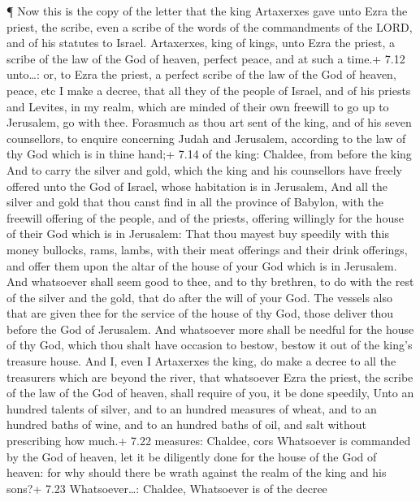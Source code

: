  ¶ Now this is the copy of the letter that the king
Artaxerxes gave unto Ezra the priest, the scribe, even a scribe of the
words of the commandments of the LORD, and of his statutes to Israel.
 Artaxerxes, king of kings, unto Ezra the priest, a scribe
of the law of the God of heaven, perfect peace, and at such a time.+
7.12 unto\ldots: or, to Ezra the priest, a perfect scribe of the law of
the God of heaven, peace, etc  I make a decree, that all
they of the people of Israel, and of his priests and Levites, in my
realm, which are minded of their own freewill to go up to Jerusalem, go
with thee.  Forasmuch as thou art sent of the king, and of
his seven counsellors, to enquire concerning Judah and Jerusalem,
according to the law of thy God which is in thine hand;+ 7.14 of the
king: Chaldee, from before the king  And to carry the
silver and gold, which the king and his counsellors have freely offered
unto the God of Israel, whose habitation is in Jerusalem, 
And all the silver and gold that thou canst find in all the province of
Babylon, with the freewill offering of the people, and of the priests,
offering willingly for the house of their God which is in Jerusalem:
 That thou mayest buy speedily with this money bullocks,
rams, lambs, with their meat offerings and their drink offerings, and
offer them upon the altar of the house of your God which is in
Jerusalem.  And whatsoever shall seem good to thee, and to
thy brethren, to do with the rest of the silver and the gold, that do
after the will of your God.  The vessels also that are
given thee for the service of the house of thy God, those deliver thou
before the God of Jerusalem.  And whatsoever more shall be
needful for the house of thy God, which thou shalt have occasion to
bestow, bestow it out of the king's treasure house.  And I,
even I Artaxerxes the king, do make a decree to all the treasurers which
are beyond the river, that whatsoever Ezra the priest, the scribe of the
law of the God of heaven, shall require of you, it be done speedily,
 Unto an hundred talents of silver, and to an hundred
measures of wheat, and to an hundred baths of wine, and to an hundred
baths of oil, and salt without prescribing how much.+ 7.22 measures:
Chaldee, cors  Whatsoever is commanded by the God of
heaven, let it be diligently done for the house of the God of heaven:
for why should there be wrath against the realm of the king and his
sons?+ 7.23 Whatsoever\ldots: Chaldee, Whatsoever is of the decree
